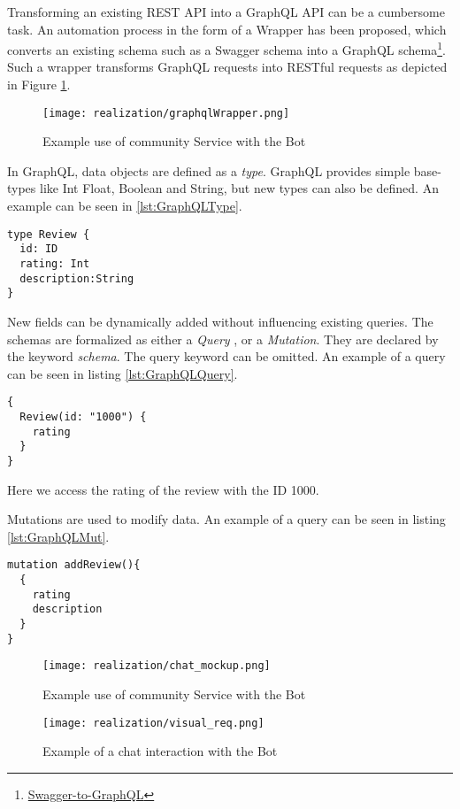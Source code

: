 Transforming an existing REST API into a GraphQL API can be a cumbersome task. An automation process in the form of a Wrapper has been proposed, which converts an existing schema such as a Swagger schema into a GraphQL schema\footnote{\href{https://github.com/yarax/swagger-to-graphql}{Swagger-to-GraphQL}}. Such a wrapper transforms GraphQL requests into RESTful requests as depicted in Figure \ref{fig:graphqlWrapper}.
\begin{figure}[h]
  \centering
  \texttt{[image: realization/graphqlWrapper.png]}
  \caption{Example use of community Service with the Bot}
  \label{fig:graphqlWrapper}
\end{figure}

In GraphQL, data objects are defined as a \emph{type}. GraphQL provides simple base-types like Int Float, Boolean and String, but new types can also be defined. An example can be seen in \ref{lst:GraphQLType}.
\begin{lstlisting}[caption={Example of a GraphQL schema},captionpos=b,label={lst:GraphQLType}]
type Review {
  id: ID
  rating: Int
  description:String
}
\end{lstlisting}
New fields can be dynamically added without influencing existing queries. The schemas are formalized as either a \emph{Query }, or a \emph{Mutation}. They are declared by the keyword \emph{schema}. The query keyword can be omitted. An example of a query can be seen in listing \ref{lst:GraphQLQuery}.
\begin{lstlisting}[caption={Example of a GraphQL Query},captionpos=b,label={lst:GraphQLQuery}]
{
  Review(id: "1000") {
    rating
  }
}
\end{lstlisting}
Here we access the rating of the review with the ID 1000.

Mutations are used to modify data. An example of a query can be seen in listing \ref{lst:GraphQLMut}.
\begin{lstlisting}[caption={Example of a GraphQL Mutation},captionpos=b,label={lst:GraphQLMut}]
mutation addReview(){
  {
	rating 
	description
  }
}
\end{lstlisting}

\begin{figure}[h]
  \centering
  \texttt{[image: realization/chat\_mockup.png]}
  \caption{Example use of community Service with the Bot}
  \label{fig:chatMockup}
\end{figure}

\begin{figure}[h]
  \centering
  \texttt{[image: realization/visual\_req.png]}
  \caption{Example of a chat interaction with the Bot}
  \label{fig:visualReq}
\end{figure}